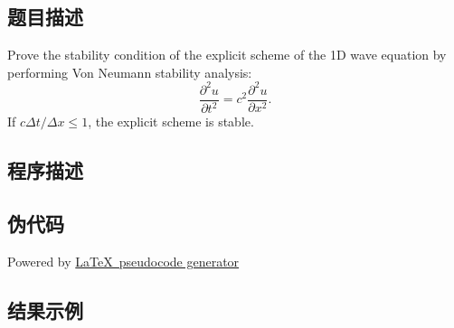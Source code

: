 \subsection{题目描述}
\noindent
Prove the stability condition of the explicit scheme of the 1D wave equation by performing Von Neumann stability analysis:
\[
    \frac{\partial^2 u}{\partial t^2} = c^2 \frac{\partial^2 u}{\partial x^2}.
\]
If \(c \Delta t / \Delta x \leq 1\), the explicit scheme is stable.

\subsection{程序描述}

\subsection{伪代码}
Powered by \href{https://chatgpt.com/g/g-xJJAA2awf-latex-pseudocode-generator}{\LaTeX \ pseudocode generator}


\subsection{结果示例}
